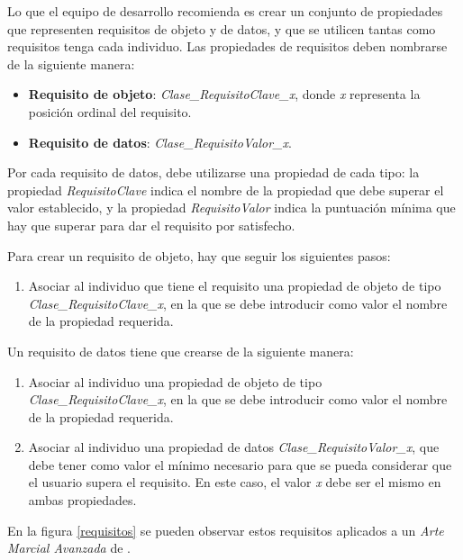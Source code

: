 Lo que el equipo de desarrollo recomienda es crear un conjunto de propiedades que representen requisitos de objeto y de datos, 
y que se utilicen tantas como requisitos tenga cada individuo. Las propiedades de requisitos deben nombrarse de la siguiente manera:
\begin{itemize}
    \item \textbf{Requisito de objeto}: \textit{Clase\_RequisitoClave\_x}, donde \textit{x} representa la posición ordinal del requisito.
    \item \textbf{Requisito de datos}: \textit{Clase\_RequisitoValor\_x}.
\end{itemize}

Por cada requisito de datos, debe utilizarse una propiedad de cada tipo: la propiedad \textit{RequisitoClave} indica el nombre de la 
propiedad que debe superar el valor establecido, y la propiedad \textit{RequisitoValor} indica la puntuación mínima que hay que 
superar para dar el requisito por satisfecho.\medskip

Para crear un requisito de objeto, hay que seguir los siguientes pasos:
\begin{enumerate}
    \item Asociar al individuo que tiene el requisito una propiedad de objeto de tipo \textit{Clase\_RequisitoClave\_x}, en la que se 
    debe introducir como valor el nombre de la propiedad requerida.
\end{enumerate}

Un requisito de datos tiene que crearse de la siguiente manera:
\begin{enumerate}
    \item Asociar al individuo una propiedad de objeto de tipo \textit{Clase\_RequisitoClave\_x}, en la que se 
    debe introducir como valor el nombre de la propiedad requerida.
    \item Asociar al individuo una propiedad de datos \textit{Clase\_RequisitoValor\_x}, que debe tener 
    como valor el mínimo necesario para que se pueda considerar que el usuario supera el requisito. En este caso, el valor \textit{x}
    debe ser el mismo en ambas propiedades.
\end{enumerate}

En la figura \ref*{requisitos} se pueden observar estos requisitos aplicados a un \textit{Arte Marcial Avanzada} de \anima.


